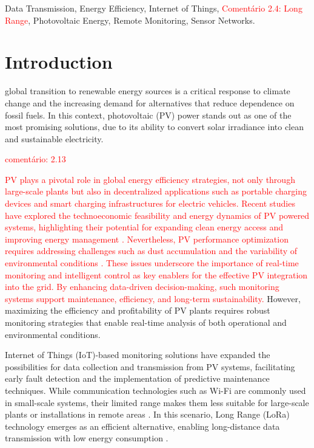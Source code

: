 \documentclass{ieeeaccess}
\begin{document}
\begin{keywords}
Data Transmission, Energy Efficiency, Internet of Things, \textcolor{red}{Comentário 2.4: Long Range}, Photovoltaic Energy, Remote Monitoring, Sensor Networks.
\end{keywords}

\titlepgskip=-15pt

\maketitle

\section{Introduction}
\label{sec:introduction}
  global transition to renewable energy sources is a critical response to climate change and the increasing demand for alternatives that reduce dependence on fossil fuels. In this context, photovoltaic (PV) power stands out as one of the most promising solutions, due to its ability to convert solar irradiance into clean and sustainable electricity. 

\textcolor{red}{comentário: 2.13}

\textcolor{red}{ PV plays a pivotal role in global energy efficiency strategies, not only through large-scale plants but also in decentralized applications such as portable charging devices and smart charging infrastructures for electric vehicles. Recent studies have explored the technoeconomic feasibility and energy dynamics of PV powered systems, highlighting their potential for expanding clean energy access and improving energy management \cite{spmfpcd2023,smartcharging2023}. Nevertheless, PV performance optimization requires addressing challenges such as dust accumulation and the variability of environmental conditions \cite{dustsurvey2023,optimizationreview2023}. These issues underscore the importance of real-time monitoring and intelligent control as key enablers for the effective PV integration into the grid. By enhancing data-driven decision-making, such monitoring systems support maintenance, efficiency, and long-term sustainability.
}
However, maximizing the efficiency and profitability of PV plants requires robust monitoring strategies that enable real-time analysis of both operational and environmental conditions. 

Internet of Things (IoT)-based monitoring solutions have expanded the possibilities for data collection and transmission from PV systems, facilitating early fault detection and the implementation of predictive maintenance techniques. While communication technologies such as Wi-Fi are commonly used in small-scale systems, their limited range makes them less suitable for large-scale plants or installations in remote areas \cite{kalay2022systematic}. In this scenario, Long Range (LoRa) technology emerges as an efficient alternative, enabling long-distance data transmission with low energy consumption \cite{ansari2021review}.
\end{document}

